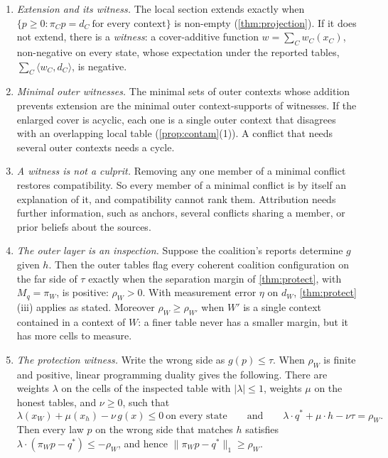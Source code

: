 \documentclass[11pt]{article}
\theoremstyle{definition}\newtheorem{definition}[theorem]{Definition}\newtheorem{remark}[theorem]{Remark}\newtheorem{example}[theorem]{Example}\newtheorem{problem}[theorem]{Open problem}\crefname{problem}{Problem}{Problems}
\begin{document}
\begin{proposition}\label{prop:outer}
\begin{enumerate}
\item[(i)] \emph{Extension and its witness.} The local section extends exactly when $\{p\ge0: \pi_Cp=d_C\ \text{for every context}\}$ is non-empty (\cref{thm:projection}). If it does not extend, there is a \emph{witness}: a cover-additive function $w=\sum_Cw_C(x_C)$, non-negative on every state, whose expectation under the reported tables, $\sum_C\langle w_C,d_C\rangle$, is negative.
\item[(ii)] \emph{Minimal outer witnesses.} The minimal sets of outer contexts whose addition prevents extension are the minimal outer context-supports of witnesses. If the enlarged cover is acyclic, each one is a single outer context that disagrees with an overlapping local table (\cref{prop:contam}(1)). A conflict that needs several outer contexts needs a cycle.
\item[(iii)] \emph{A witness is not a culprit.} Removing any one member of a minimal conflict restores compatibility. So every member of a minimal conflict is by itself an explanation of it, and compatibility cannot rank them. Attribution needs further information, such as anchors, several conflicts sharing a member, or prior beliefs about the sources.
\item[(iv)] \emph{The outer layer is an inspection.} Suppose the coalition's reports determine $g$ given $h$. Then the outer tables flag every coherent coalition configuration on the far side of $\tau$ exactly when the separation margin of \cref{thm:protect}, with $M_q=\pi_W$, is positive: $\rho_W>0$. With measurement error $\eta$ on $d_W$, \cref{thm:protect}(iii) applies as stated. Moreover $\rho_W\ge\rho_{W'}$ when $W'$ is a single context contained in a context of $W$: a finer table never has a smaller margin, but it has more cells to measure.
\item[(v)] \emph{The protection witness.} Write the wrong side as $g(p)\le\tau$. When $\rho_W$ is finite and positive, linear programming duality gives the following. There are weights $\lambda$ on the cells of the inspected table with $|\lambda|\le1$, weights $\mu$ on the honest tables, and $\nu\ge0$, such that
\[
\lambda(x_W)+\mu(x_h)-\nu\,g(x)\le0\ \text{on every state}\qquad\text{and}\qquad\lambda\cdot q^\ast+\mu\cdot h-\nu\tau=\rho_W .
\]
Then every law $p$ on the wrong side that matches $h$ satisfies $\lambda\cdot(\pi_Wp-q^\ast)\le-\rho_W$, and hence $\|\pi_Wp-q^\ast\|_1\ge\rho_W$.
\end{enumerate}
\end{proposition}
\end{document}
